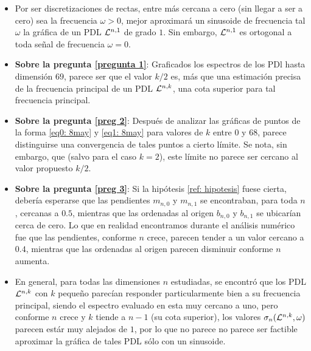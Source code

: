 \begin{itemize}
\item Por ser discretizaciones de rectas,
entre más cercana a cero (sin llegar
a ser a cero) sea la frecuencia
$\omega >0$, mejor aproximará un sinusoide 
de frecuencia tal $\omega$ la gráfica de un
PDL $\mathcal{L}^{n,1}$ de grado $1$. Sin embargo,
$\mathcal{L}^{n,1}$ es ortogonal a toda señal de frecuencia
$\omega = 0$.

\item \textbf{Sobre la pregunta \ref{pregunta 1}}:
Graficados los espectros de los PDl hasta dimensión $69$, parece
ser que el valor $k/2$ es, más que una estimación precisa
de la frecuencia principal de un PDL $\mathcal{L}^{n,k}$, una cota
superior para tal frecuencia principal.

\item \textbf{Sobre la pregunta \ref{preg 2}}: 
Después de analizar las gráficas 
de puntos de la forma 
\eqref{eq0: 8may} y \eqref{eq1: 8may}
para valores de $k$ entre $0$ y $68$, parece distinguirse
una convergencia de tales puntos a cierto límite.
Se nota, sin embargo, que (salvo para el caso
$k = 2$), este límite no parece ser cercano
al valor propuesto $k/2$.

\item \textbf{Sobre la pregunta \ref{preg 3}}:
Si la hipótesis \ref{ref: hipotesis} fuese cierta, debería
esperarse que las pendientes
$m_{n,0}$ y $m_{n,1}$ se encontraban, para toda $n$,
cercanas a $0.5$, mientras que las ordenadas al origen
$b_{n,0}$ y $b_{n,1}$ se ubicarían cerca de cero. Lo que en realidad
encontramos durante el análisis numérico fue que
las pendientes, conforme $n$ crece, parecen tender a un 
valor cercano a 
$0.4$, mientras que las ordenadas al origen parecen
disminuir conforme $n$ aumenta. 


\item 
En general, para todas las dimensiones $n$ estudiadas,
se encontró que los PDL $\mathcal{L}^{n,k}$ con $k$
pequeño parecían responder particularmente bien
a su frecuencia principal, siendo el espectro
evaluado en esta muy cercano a uno, pero conforme
$n$ crece y 
$k$ tiende a $n-1$ (su cota superior),
los valores $\sigma_{n}(\mathcal{L}^{n,k}, \omega)$
parecen estár muy alejados de $1$, por lo que no parece
no parece ser factible aproximar la gráfica
de tales PDL sólo con un sinusoide.
\end{itemize}